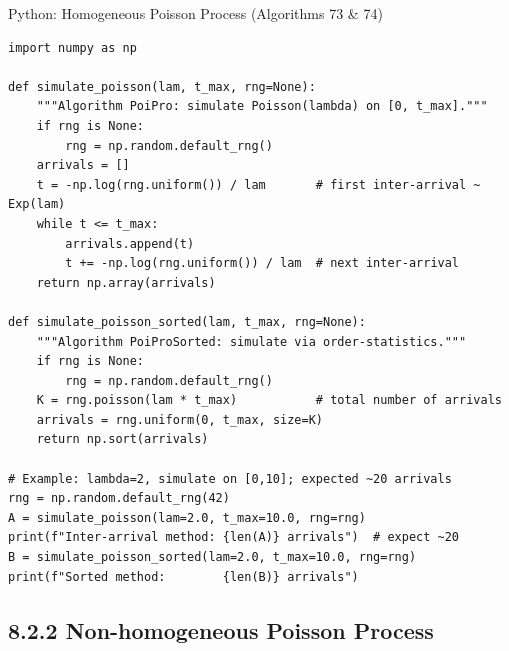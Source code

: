 \documentclass[aspectratio=169,10pt]{beamer}
\begin{document}
\begin{frame}[fragile]{Python: Homogeneous Poisson Process (Algorithms 73 \& 74)}
\begin{lstlisting}[style=python]
import numpy as np

def simulate_poisson(lam, t_max, rng=None):
    """Algorithm PoiPro: simulate Poisson(lambda) on [0, t_max]."""
    if rng is None:
        rng = np.random.default_rng()
    arrivals = []
    t = -np.log(rng.uniform()) / lam       # first inter-arrival ~ Exp(lam)
    while t <= t_max:
        arrivals.append(t)
        t += -np.log(rng.uniform()) / lam  # next inter-arrival
    return np.array(arrivals)

def simulate_poisson_sorted(lam, t_max, rng=None):
    """Algorithm PoiProSorted: simulate via order-statistics."""
    if rng is None:
        rng = np.random.default_rng()
    K = rng.poisson(lam * t_max)           # total number of arrivals
    arrivals = rng.uniform(0, t_max, size=K)
    return np.sort(arrivals)

# Example: lambda=2, simulate on [0,10]; expected ~20 arrivals
rng = np.random.default_rng(42)
A = simulate_poisson(lam=2.0, t_max=10.0, rng=rng)
print(f"Inter-arrival method: {len(A)} arrivals")  # expect ~20
B = simulate_poisson_sorted(lam=2.0, t_max=10.0, rng=rng)
print(f"Sorted method:        {len(B)} arrivals")
\end{lstlisting}
\end{frame}

\subsection{8.2.2 Non-homogeneous Poisson Process}
\end{document}
